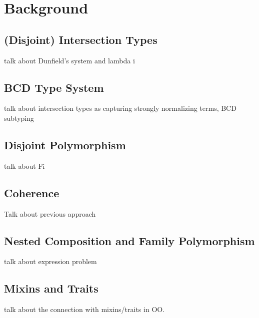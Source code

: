 
\chapter{Background}



\section{(Disjoint) Intersection Types}

talk about Dunfield's system and lambda i

\section{BCD Type System}

talk about intersection types as capturing  strongly normalizing terms, BCD subtyping

\section{Disjoint Polymorphism}

talk about Fi

\section{Coherence}

Talk about previous approach


\section{Nested Composition and Family Polymorphism}


talk about expression problem

\section{Mixins and Traits}

talk about the connection with mixins/traits in OO.




